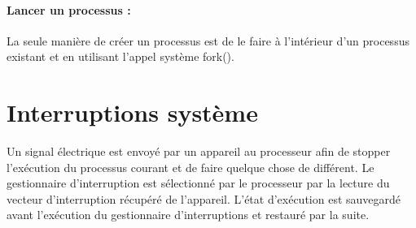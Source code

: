 \documentclass{article}[12pt]
\begin{document}
\paragraph{Lancer un processus : } La seule manière de créer un processus est de le faire à l'intérieur d'un processus existant et en utilisant l'appel système fork().
\section{Interruptions système}
Un signal électrique est envoyé par un appareil au processeur afin de stopper l'exécution du processus courant et de faire quelque chose de différent. Le gestionnaire d'interruption est sélectionné par le processeur par la lecture du vecteur d'interruption récupéré de l'appareil. L'état d'exécution est sauvegardé avant l'exécution du gestionnaire d'interruptions et restauré par la suite.
\end{document}
